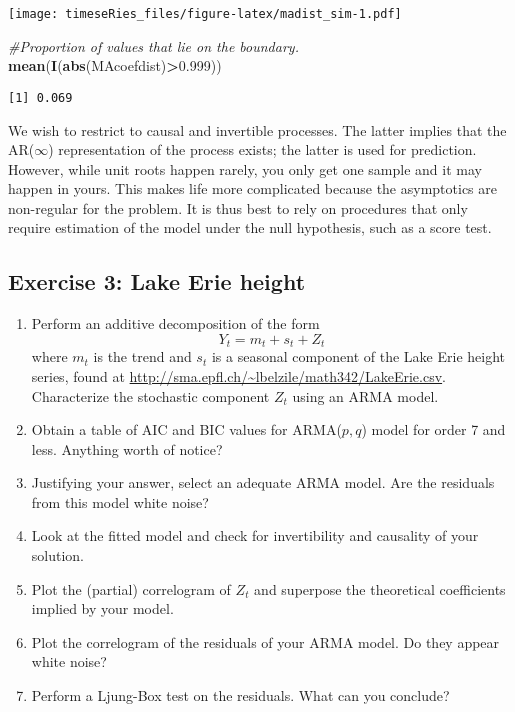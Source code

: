 \documentclass[]{book}
\newenvironment{Shaded}{\begin{snugshade}}{\end{snugshade}}
\newcommand{\CommentTok}[1]{\textcolor[rgb]{0.56,0.35,0.01}{\textit{#1}}}
\newcommand{\FloatTok}[1]{\textcolor[rgb]{0.00,0.00,0.81}{#1}}
\newcommand{\KeywordTok}[1]{\textcolor[rgb]{0.13,0.29,0.53}{\textbf{#1}}}
\newcommand{\NormalTok}[1]{#1}
\newcommand{\OperatorTok}[1]{\textcolor[rgb]{0.81,0.36,0.00}{\textbf{#1}}}
\providecommand{\tightlist}{%
  \setlength{\itemsep}{0pt}\setlength{\parskip}{0pt}}
\begin{document}
\texttt{[image: timeseRies\_files/figure-latex/madist\_sim-1.pdf]}

\begin{Shaded}
\begin{Highlighting}[]
\CommentTok{#Proportion of values that lie on the boundary.}
\KeywordTok{mean}\NormalTok{(}\KeywordTok{I}\NormalTok{(}\KeywordTok{abs}\NormalTok{(MAcoefdist)}\OperatorTok{>}\FloatTok{0.999}\NormalTok{))}
\end{Highlighting}
\end{Shaded}

\begin{verbatim}
[1] 0.069
\end{verbatim}

We wish to restrict to causal and invertible processes. The latter
implies that the AR(\(\infty\)) representation of the process exists;
the latter is used for prediction. However, while unit roots happen
rarely, you only get one sample and it may happen in yours. This makes
life more complicated because the asymptotics are non-regular for the
problem. It is thus best to rely on procedures that only require
estimation of the model under the null hypothesis, such as a score test.

\hypertarget{exercise-3-lake-erie-height}{%
\subsection{Exercise 3: Lake Erie
height}\label{exercise-3-lake-erie-height}}

\begin{enumerate}
\def\labelenumi{\arabic{enumi}.}
\tightlist
\item
  Perform an additive decomposition of the form
  \[Y_t = m_t + s_t + Z_t\] where \(m_t\) is the trend and \(s_t\) is a
  seasonal component of the Lake Erie height series, found at
  \href{\%5Bhttp://sma.epfl.ch/~lbelzile/math342/LakeErie.csv\%5D}{http://sma.epfl.ch/\textasciitilde{}lbelzile/math342/LakeErie.csv}.
  Characterize the stochastic component \(Z_t\) using an ARMA model.
\item
  Obtain a table of AIC and BIC values for ARMA(\(p, q\)) model for
  order 7 and less. Anything worth of notice?
\item
  Justifying your answer, select an adequate ARMA model. Are the
  residuals from this model white noise?
\item
  Look at the fitted model and check for invertibility and causality of
  your solution.
\item
  Plot the (partial) correlogram of \(Z_t\) and superpose the
  theoretical coefficients implied by your model.
\item
  Plot the correlogram of the residuals of your ARMA model. Do they
  appear white noise?
\item
  Perform a Ljung-Box test on the residuals. What can you conclude?
\end{enumerate}
\end{document}
